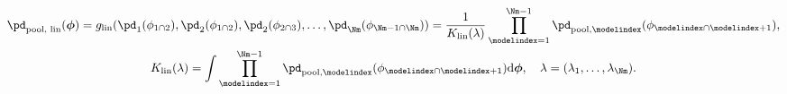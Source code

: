\begin{equation}
\begin{gathered}
  \pd_{\text{pool, lin}} (\boldsymbol{\phi}) = 
  g_{\text{lin}}(\pd_{1}(\phi_{1 \cap 2}), \pd_{2}(\phi_{1 \cap 2}), \pd_{2}(\phi_{2 \cap 3}), \ldots, \pd_{\Nm}(\phi_{\Nm - 1 \cap \Nm}) ) =
  \frac{1}{K_{\text{lin}}(\lambda)}
  \prod_{\modelindex = 1}^{\Nm - 1}
  \pd_{\text{pool}, \modelindex}(\phi_{\modelindex \cap \modelindex + 1}), \\
  K_{\text{lin}}(\lambda) = 
    \int 
      \prod_{\modelindex = 1}^{\Nm - 1}
      \pd_{\text{pool}, \modelindex}(\phi_{\modelindex \cap \modelindex + 1})
    \text{d}\boldsymbol{\phi},
  \quad \lambda = (\lambda_{1}, \ldots, \lambda_{\Nm}).
  \label{eqn:silly-linear-overall}
\end{gathered}
\end{equation}